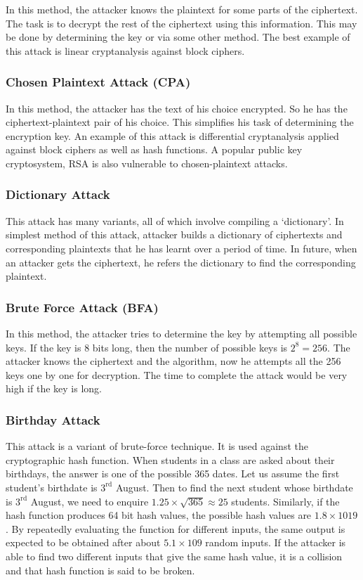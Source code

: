 \documentclass[british]{article}
\begin{document}
In this method, the attacker knows the plaintext for some parts of
the ciphertext. The task is to decrypt the rest of the ciphertext
using this information. This may be done by determining the key or
via some other method. The best example of this attack is linear cryptanalysis
against block ciphers.

\subsubsection{Chosen Plaintext Attack (CPA)}

In this method, the attacker has the text of his choice encrypted.
So he has the ciphertext-plaintext pair of his choice. This simplifies
his task of determining the encryption key. An example of this attack
is differential cryptanalysis applied against block ciphers as well
as hash functions. A popular public key cryptosystem, RSA is also
vulnerable to chosen-plaintext attacks.

\subsubsection{Dictionary Attack}

This attack has many variants, all of which involve compiling a `dictionary'.
In simplest method of this attack, attacker builds a dictionary of
ciphertexts and corresponding plaintexts that he has learnt over a
period of time. In future, when an attacker gets the ciphertext, he
refers the dictionary to find the corresponding plaintext.

\subsubsection{Brute Force Attack (BFA)}

In this method, the attacker tries to determine the key by attempting
all possible keys. If the key is 8 bits long, then the number of possible
keys is $2^{8}=256$. The attacker knows the ciphertext and the algorithm,
now he attempts all the 256 keys one by one for decryption. The time
to complete the attack would be very high if the key is long.

\subsubsection{Birthday Attack}

This attack is a variant of brute-force technique. It is used against
the cryptographic hash function. When students in a class are asked
about their birthdays, the answer is one of the possible 365 dates.
Let us assume the first student's birthdate is $3^{\text{rd}}$ August.
Then to find the next student whose birthdate is $3^{\text{rd}}$
August, we need to enquire ${\displaystyle 1.25\times\sqrt{365}\approx25}$
students. Similarly, if the hash function produces 64 bit hash values,
the possible hash values are $1.8\times1019$. By repeatedly evaluating
the function for different inputs, the same output is expected to
be obtained after about $5.1\times109$ random inputs. If the attacker
is able to find two different inputs that give the same hash value,
it is a collision and that hash function is said to be broken.
\end{document}
